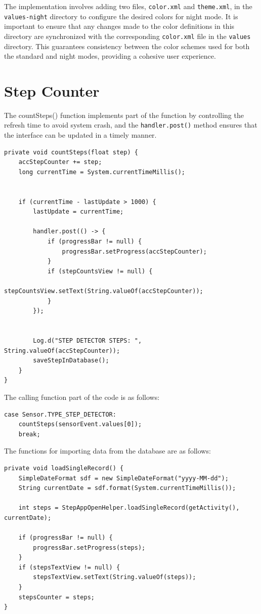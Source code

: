 \documentclass{article}
\begin{document}
The implementation involves adding two files, \texttt{color.xml} and \texttt{theme.xml}, in the \texttt{values-night} directory to configure the desired colors for night mode. It is important to ensure that any changes made to the color definitions in this directory are synchronized with the corresponding \texttt{color.xml} file in the \texttt{values} directory. This guarantees consistency between the color schemes used for both the standard and night modes, providing a cohesive user experience.

\section{Step Counter}
The countSteps() function implements part of the function by controlling the refresh time to avoid system crash, and the \texttt{handler.post()} method ensures that the interface can be updated in a timely manner.
\begin{lstlisting}
private void countSteps(float step) {
    accStepCounter += step;
    long currentTime = System.currentTimeMillis();


    if (currentTime - lastUpdate > 1000) {
        lastUpdate = currentTime;

        handler.post(() -> {
            if (progressBar != null) {
                progressBar.setProgress(accStepCounter);
            }
            if (stepCountsView != null) {
                stepCountsView.setText(String.valueOf(accStepCounter));
            }
        });


        Log.d("STEP DETECTOR STEPS: ", String.valueOf(accStepCounter));
        saveStepInDatabase();
    }
}
\end{lstlisting}
The calling function part of the code is as follows:
\begin{lstlisting}
case Sensor.TYPE_STEP_DETECTOR:
    countSteps(sensorEvent.values[0]);
    break;
\end{lstlisting}
The functions for importing data from the database are as follows:
\newpage
\begin{lstlisting}
private void loadSingleRecord() {
    SimpleDateFormat sdf = new SimpleDateFormat("yyyy-MM-dd");
    String currentDate = sdf.format(System.currentTimeMillis());

    int steps = StepAppOpenHelper.loadSingleRecord(getActivity(), currentDate);

    if (progressBar != null) {
        progressBar.setProgress(steps);
    }
    if (stepsTextView != null) {
        stepsTextView.setText(String.valueOf(steps));
    }
    stepsCounter = steps;
}
\end{lstlisting}
\end{document}
